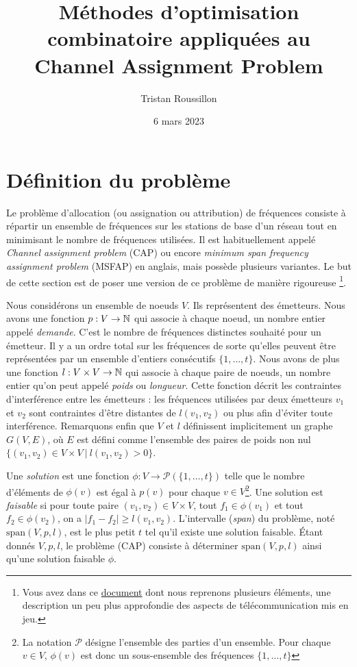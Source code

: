 \documentclass[a4paper,francais]{article}
\title{Méthodes d'optimisation combinatoire appliquées au Channel Assignment Problem}
\author{Tristan Roussillon}
\date{6 mars 2023}
\newcommand{\N}{{\ensuremath\mathbb{N}}}
\theoremstyle{definition}
\begin{document}
\maketitle


\section{Définition du problème}
\label{sec:CAP}

Le problème d'allocation (ou assignation ou attribution) de fréquences consiste
à répartir un ensemble de fréquences sur les stations de base d'un réseau
tout en minimisant le nombre de fréquences utilisées. Il est habituellement
appelé \emph{Channel assignment problem} (CAP) ou encore \emph{minimum span frequency
  assignment problem} (MSFAP) en anglais, mais possède plusieurs variantes.
Le but de cette section est de poser une version de ce problème de manière rigoureuse
\footnote{Vous avez dans ce \href{http://www-sop.inria.fr/members/Frederic.Havet/Cours/channel.pdf}{document}
  dont nous reprenons plusieurs éléments, une description un peu plus approfondie
  des aspects de télécommunication mis en jeu.}.

Nous considérons un ensemble de noeuds $V$. Ils représentent des émetteurs.
Nous avons une fonction $p : V \rightarrow \N$ qui associe à chaque noeud, un nombre
entier appelé \emph{demande}. C'est le nombre de fréquences distinctes souhaité pour
un émetteur. Il y a un ordre total sur les fréquences de sorte qu'elles peuvent être
représentées par un ensemble d'entiers consécutifs $\{1, \dots, t\}$.
Nous avons de plus une fonction $l : V \times V \rightarrow \N$
qui associe à chaque paire de noeuds, un nombre entier qu'on peut appelé \emph{poids}
ou \emph{longueur}. 
Cette fonction décrit les contraintes d'interférence entre les émetteurs :
les fréquences utilisées par deux émetteurs $v_1$ et $v_2$ sont contraintes
d'être distantes de $l(v_1,v_2)$ ou plus afin d'éviter toute interférence.
Remarquons enfin que $V$ et $l$ définissent implicitement un graphe $G(V,E)$, 
où $E$ est défini comme l'ensemble des paires de poids non nul
$\{ (v_1,v_2) \in V \times V \ | \ l(v_1,v_2) > 0 \}$.  
 
Une \emph{solution} est une fonction $\phi : V \rightarrow \mathcal{P}(\{1,\dots,t\})$ telle que
le nombre d'éléments de $\phi(v)$ est égal à $p(v)$ pour chaque $v \in V$\footnote{La
  notation $\mathcal{P}$ désigne l'ensemble des parties d'un ensemble. Pour
  chaque $v \in V$, $\phi(v)$ est donc un sous-ensemble des fréquences $\{1,\dots,t\}$}.
Une solution est \emph{faisable} si pour toute paire $(v_1,v_2) \in V \times V$,
tout $f_1 \in \phi(v_1)$ et tout $f_2 \in \phi(v_2)$, on a $|f_1 - f_2| \geq l(v_1,v_2)$.
L'intervalle (\emph{span}) du problème, noté $\text{span}(V, p, l)$, est le plus petit $t$
tel qu'il existe une solution faisable.
\'Etant donnés $V, p, l$, le problème (CAP) consiste à déterminer $\text{span}(V, p, l)$
ainsi qu'une solution faisable $\phi$.
\end{document}
